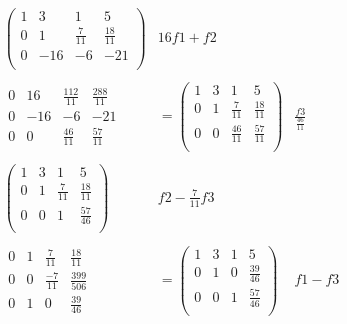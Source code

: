 \[
  \begin{aligned}
    \left(
            \begin{array}{ccc|c}
                1 & 3 & 1 & 5 \\
                0 & 1 & \frac{7}{11} & \frac{18}{11} \\
                0 & -16 & -6 & -21 \\
            \end{array}
        \right)
        & 16f1+f2 \\ \\
        \begin{array}{ccc|c}
            0 & 16 & \frac{112}{11} & \frac{288}{11} \\
            0 & -16 & -6 & -21 \\
            \hline
            0 & 0 & \frac{46}{11} & \frac{57}{11}
        \end{array}
        & =
        \left(
            \begin{array}{ccc|c}
                1 & 3 & 1 & 5 \\
                0 & 1 & \frac{7}{11} & \frac{18}{11} \\
                0 & 0 & \frac{46}{11} & \frac{57}{11} \\
            \end{array}
        \right)
        & \frac{f3}{\frac{46}{11}} \\ \\
        \left(
            \begin{array}{ccc|c}
                1 & 3 & 1 & 5 \\
                0 & 1 & \frac{7}{11} & \frac{18}{11} \\
                0 & 0 & 1 & \frac{57}{46} \\
            \end{array}
        \right)
        & f2-\frac{7}{11}f3 \\ \\
        \begin{array}{ccc|c}
            0 & 1 & \frac{7}{11} & \frac{18}{11} \\
            0 & 0 & \frac{-7}{11} & \frac{399}{506} \\
            \hline
            0 & 1 & 0 & \frac{39}{46}
        \end{array}
        & =
        \left(
            \begin{array}{ccc|c}
                1 & 3 & 1 & 5 \\
                0 & 1 & 0 & \frac{39}{46} \\
                0 & 0 & 1 & \frac{57}{46} \\
            \end{array}
        \right)
        & f1-f3 \\ \\
  \end{aligned}  
\]

